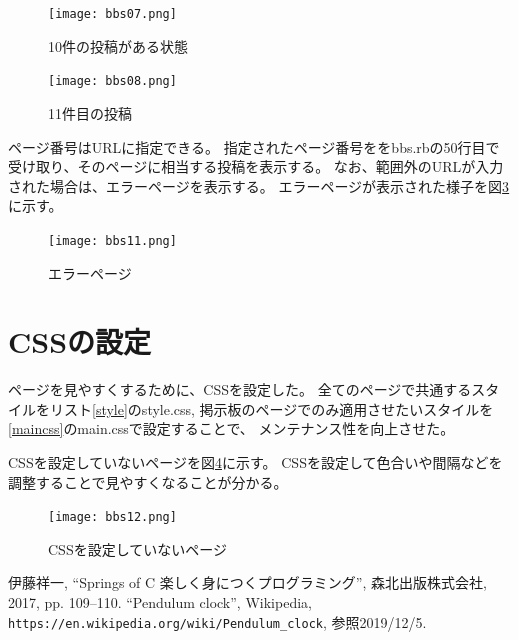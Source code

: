 \documentclass[a4j,titlepage]{jsarticle}
\begin{document}
\begin{figure}[H]
  \centering
  \texttt{[image: bbs07.png]}
  \caption{10件の投稿がある状態}
  \label{f5}
\end{figure}

\begin{figure}[H]
  \centering
  \texttt{[image: bbs08.png]}
  \caption{11件目の投稿}
  \label{f6}
\end{figure}

ページ番号はURLに指定できる。
指定されたページ番号ををbbs.rbの50行目で受け取り、そのページに相当する投稿を表示する。
なお、範囲外のURLが入力された場合は、エラーページを表示する。
エラーページが表示された様子を図\ref{f7}に示す。

\begin{figure}[H]
  \centering
  \texttt{[image: bbs11.png]}
  \caption{エラーページ}
  \label{f7}
\end{figure}

\section{CSSの設定}
ページを見やすくするために、CSSを設定した。
全てのページで共通するスタイルをリスト\ref{style}のstyle.css, %
掲示板のページでのみ適用させたいスタイルを\ref{maincss}のmain.cssで設定することで、
メンテナンス性を向上させた。

CSSを設定していないページを図\ref{f8}に示す。
CSSを設定して色合いや間隔などを調整することで見やすくなることが分かる。

\begin{figure}[H]
  \centering
  \texttt{[image: bbs12.png]}
  \caption{CSSを設定していないページ}
  \label{f8}
\end{figure}

\begin{thebibliography}{9}
   伊藤祥一, ``Springs of C 楽しく身につくプログラミング'', 森北出版株式会社, 2017, pp. 109--110.
   ``Pendulum clock'', Wikipedia, \texttt{https://en.wikipedia.org/wiki/Pendulum_clock}, 参照2019/12/5.
\end{thebibliography}
\end{document}
